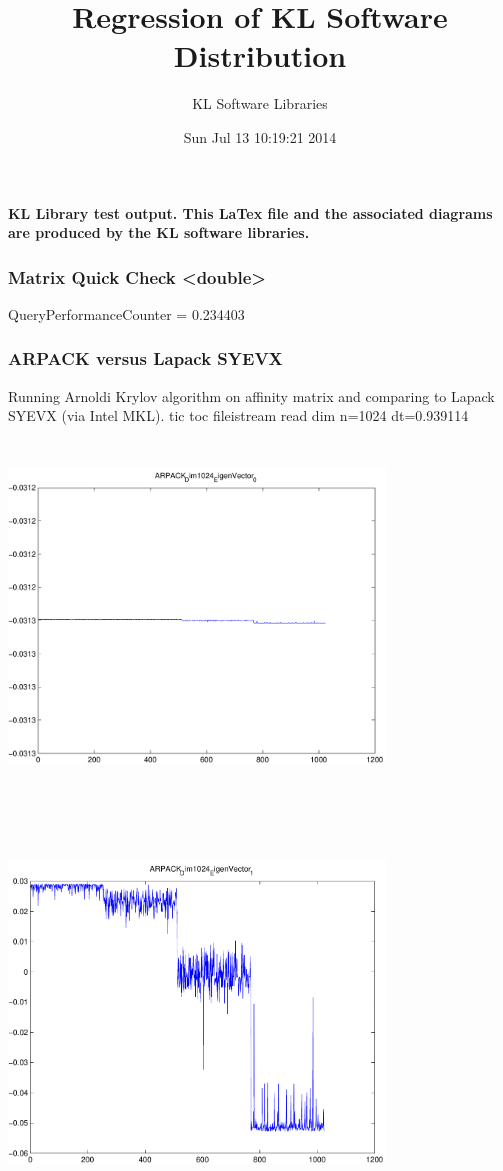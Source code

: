 \documentclass[9pt]{article}
\theoremstyle{plain}
\theoremstyle{definition}
\theoremstyle{remark}
\numberwithin{equation}{section}
\begin{document}
\title{Regression of KL Software Distribution   }
\author{KL Software Libraries}
\date{Sun Jul 13 10:19:21 2014
}
\maketitle
\textbf{ KL Library test output.  This LaTex file and the associated diagrams are produced by the KL software libraries.}
\subsubsection{Matrix Quick Check <double>}
QueryPerformanceCounter  =  0.234403
\subsubsection{ARPACK versus Lapack SYEVX}
Running Arnoldi Krylov algorithm on affinity matrix and comparing to Lapack SYEVX (via Intel MKL).
tic toc fileistream read dim n=1024 dt=0.939114
\includegraphics[width=10.0cm,height=10.0cm]{ARPACK_Dim1024_EigenVector_0.pdf}

\includegraphics[width=10.0cm,height=10.0cm]{ARPACK_Dim1024_EigenVector_1.pdf}
\end{document}
